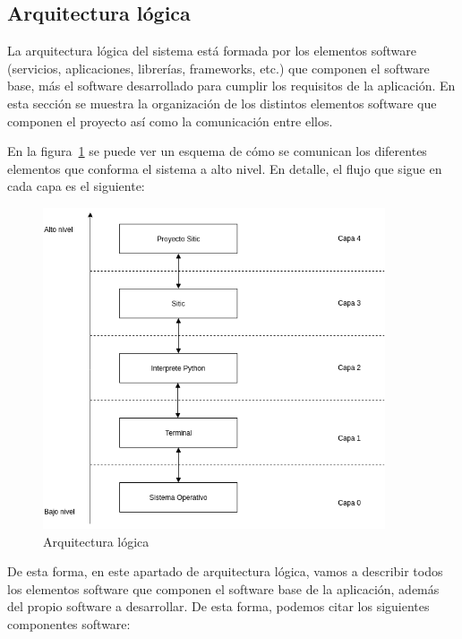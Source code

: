 \subsection{Arquitectura lógica}

La arquitectura lógica del sistema está formada por los elementos software
(servicios, aplicaciones, librerías, frameworks, etc.) que componen el software base,
más el software desarrollado para cumplir los requisitos de la aplicación. En esta
sección se muestra la organización de los distintos elementos software que
componen el proyecto así como la comunicación entre ellos.

En la figura~\ref{fig:arquitectura-logica}  se puede ver un esquema de cómo se comunican los diferentes
elementos que conforma el sistema a alto nivel. En detalle, el flujo que sigue
en cada capa es el siguiente:

\begin{figure}[htbp]
    \centering
    \includegraphics[width=0.9\textwidth]{5_diseno/arquitectura_logica}
    \caption{Arquitectura lógica}
    \label{fig:arquitectura-logica}
\end{figure}

De esta forma, en este apartado de arquitectura lógica, vamos a describir todos los elementos
software que componen el software base de la aplicación, además del propio software a desarrollar.
De esta forma, podemos citar los siguientes componentes software:


